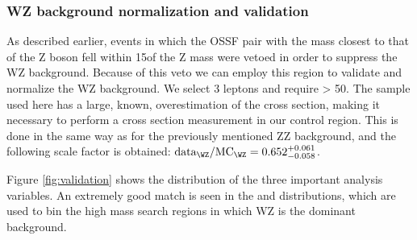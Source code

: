 \subsubsection{WZ background normalization and validation}\label{sec:promptwz}
As described earlier, events in which the OSSF pair with the mass
closest to that of the Z boson fell within 15\GeV of the Z mass were
vetoed in order to suppress the WZ background. Because of this veto we
can employ this region to validate and normalize the WZ background. We
select 3 \ti  leptons and require \ptmiss> 50\GeV.
The sample used here has a large, known, overestimation of
the cross section, making it necessary to perform a cross section
measurement in our control region. This is done in the same way as for
the previously mentioned ZZ background, and the following scale factor
is obtained: $\text{data}_{\WZ}/\text{MC}_{\WZ}= 0.652_{-0.058}^{+0.061}$.

Figure \ref{fig:validation} shows the distribution of the three
important analysis variables. An extremely good match is seen in the
\mmin  and \mtmin  distributions, which are used to bin the high mass
search regions in which WZ is the dominant background.


